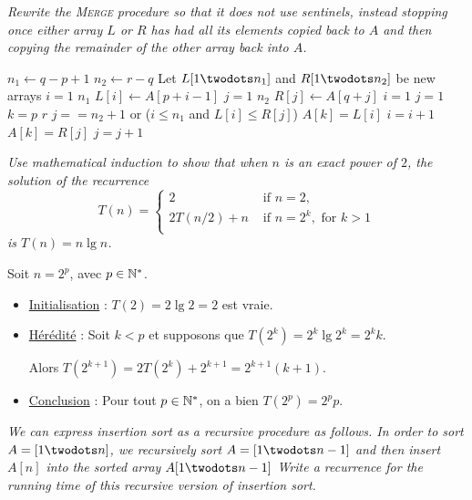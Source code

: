 \begin{description}
\begin{ex}
    \end{ex}

   {\itshape Rewrite the \textsc{Merge} procedure so that it does not use sentinels, instead stopping once either array $L$ or $R$ has had all its elements copied back to $A$ and then copying the remainder of the other array back into $A$.}

    \begin{ex}
      \begin{codebox}
        \li $n_1 \gets q - p + 1$
        \li $n_2 \gets r - q$
        \li Let $L[1\twodots n_1]$ and $R[1\twodots n_2]$ be new arrays
        \li \For $i = 1$ \To $n_1$ \Do
        \li $L[i] \gets A[p + i -1]$ \End
        \li \For $j = 1$ \To $n_2$ \Do
        \li $R[j] \gets A[q + j]$ \End
        \li $i = 1$
        \li $j = 1$
        \li \For $k = p$ \To $r$ \Do
        \li \If $ j == n_2+1$ or  ($i \le n_1$ and $L[i] \le R[j]$) \Then
        \li $A[k] = L[i]$
        \li $i = i+1$
        \li \Else 
        \li $A[k] = R[j]$
        \li $j = j+1$\End \End
      \end{codebox}
    \end{ex}

   {\itshape Use mathematical induction to show that when $n$ is an exact power of $2$, the solution of the recurrence 
    \[T(n) = \left\{
      \begin{array}{ll}
        2 & \text{ if } n = 2,\\
        2T(n/2)+n & \text{ if }n = 2^k, \text{ for } k> 1\\
      \end{array}
    \right.\]
  is $T(n) = n\lg n$.}

    \begin{ex}
      Soit $n = 2^p$, avec $p \in \mathbb{N}^*$.
      \begin{itemize}
        \item \ul{Initialisation} : $T(2) = 2\lg 2 = 2$ est vraie.
        \item \ul{Hérédité} : Soit $k < p$ et supposons que $T(2^k) = 2^k\lg 2^k = 2^kk$.

          Alors $T(2^{k+1}) = 2T(2^k)+2^{k+1} = 2^{k+1}(k+1)$.
        \item \ul{Conclusion} : Pour tout $p \in \mathbb{N}^*$, on a bien $T(2^p) = 2^p p$.
      \end{itemize}
    \end{ex}

   {\itshape We can express insertion sort as a recursive procedure as follows. In order to sort ${ A = [1 \twodots n]}$, we recursively sort $A = [1 \twodots n-1]$ and then insert $A[n]$ into the sorted array ${A[1 \twodots n-1]}$ Write a recurrence for the running time of this recursive version of
insertion sort.}


\end{description}
